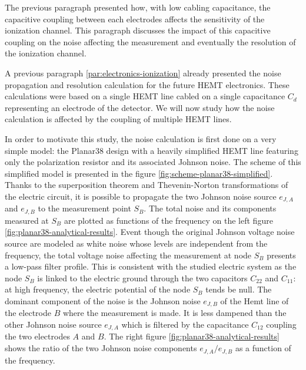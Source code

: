 The previous paragraph presented how, with low cabling capacitance, the capacitive coupling between each electrodes affects the sensitivity of the ionization channel. This paragraph discusses the impact of this capacitive coupling on the noise affecting the measurement and eventually the resolution of the ionization channel.

A previous paragraph \ref{par:electronics-ionization} already presented the noise propagation and resolution calculation for the future HEMT electronics. These calculations were based on a single HEMT line cabled on a single capacitance $C_d$ representing an electrode of the detector. We will now study how the noise calculation is affected by the coupling of multiple HEMT lines.

In order to motivate this study, the noise calculation is first done on a very simple model: the Planar38 design with a heavily simplified HEMT line featuring only the polarization resistor and its associated Johnson noise. The scheme of this simplified model is presented in the figure \ref{fig:scheme-planar38-simplified}. Thanks to the superposition theorem and Thevenin-Norton transformations of the electric circuit, it is possible to propagate the two Johnson noise source $e_{J,A}$ and $e_{J,B}$ to the measurement point $S_B$. The total noise and its components measured at $S_B$ are plotted as functions of the frequency on the left figure \ref{fig:planar38-analytical-results}. Event though the original Johnson voltage noise source are modeled as white noise whose levels are independent from the frequency, the total voltage noise affecting the measurement at node $S_B$ presents a low-pass filter profile. This is consistent with the studied electric system as the node $S_B$ is linked to the electric ground through the two capacitors $C_{22}$ and $C_{11}$: at high frequency, the electric potential of the node $S_B$ tends be null. The dominant component of the noise is the Johnson noise $e_{J,B}$ of the Hemt line of the electrode $B$ where the measurement is made. It is less dampened than the other Johnson noise source $e_{J,A}$ which is filtered by the capacitance $C_{12}$ coupling the two electrodes $A$ and $B$. The right figure \ref{fig:planar38-analytical-results} shows the ratio of the two Johnson noise components $e_{J,A}/e_{J,B}$ as a function of the frequency.

